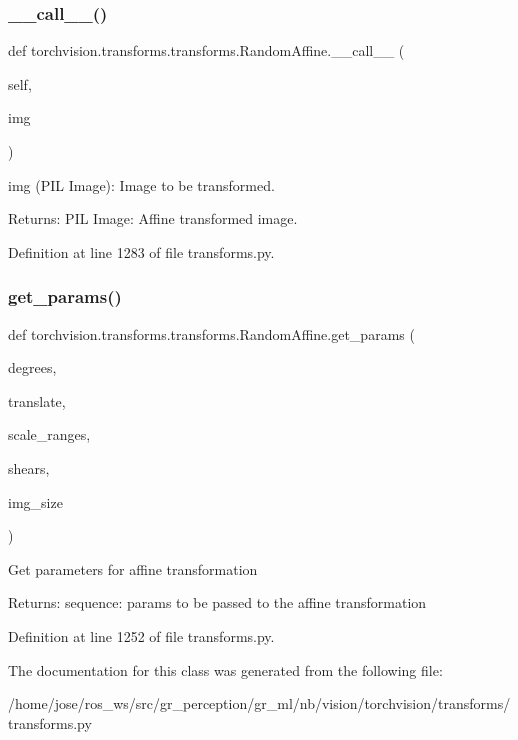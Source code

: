 \subsubsection{\texorpdfstring{\+\_\+\+\_\+call\+\_\+\+\_\+()}{\_\_call\_\_()}}
{\footnotesize\ttfamily def torchvision.\+transforms.\+transforms.\+Random\+Affine.\+\_\+\+\_\+call\+\_\+\+\_\+ (\begin{DoxyParamCaption}\item[{}]{self,  }\item[{}]{img }\end{DoxyParamCaption})}

\begin{DoxyVerb}    img (PIL Image): Image to be transformed.

Returns:
    PIL Image: Affine transformed image.
\end{DoxyVerb}
 

Definition at line 1283 of file transforms.\+py.

\mbox{\label{classtorchvision_1_1transforms_1_1transforms_1_1RandomAffine_a3605d8f67e6ccd9d79086acb064992aa}} 
\subsubsection{\texorpdfstring{get\+\_\+params()}{get\_params()}}
{\footnotesize\ttfamily def torchvision.\+transforms.\+transforms.\+Random\+Affine.\+get\+\_\+params (\begin{DoxyParamCaption}\item[{}]{degrees,  }\item[{}]{translate,  }\item[{}]{scale\+\_\+ranges,  }\item[{}]{shears,  }\item[{}]{img\+\_\+size }\end{DoxyParamCaption})\hspace{0.3cm}{\ttfamily [static]}}

\begin{DoxyVerb}Get parameters for affine transformation

Returns:
    sequence: params to be passed to the affine transformation
\end{DoxyVerb}
 

Definition at line 1252 of file transforms.\+py.



The documentation for this class was generated from the following file\+:\begin{DoxyCompactItemize}
\item 
/home/jose/ros\+\_\+ws/src/gr\+\_\+perception/gr\+\_\+ml/nb/vision/torchvision/transforms/transforms.\+py\end{DoxyCompactItemize}
